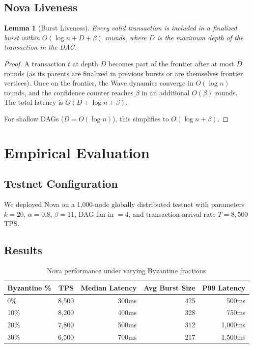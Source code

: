 \documentclass[11pt,a4paper]{article}
\newtheorem{lemma}[theorem]{Lemma}
\begin{document}
\subsection{Nova Liveness}

\begin{lemma}[Burst Liveness]
\label{lem:nova-liveness}
Every valid transaction is included in a finalized burst within $O(\log n + D + \beta)$
rounds, where $D$ is the maximum depth of the transaction in the DAG.
\end{lemma}

\begin{proof}
A transaction $t$ at depth $D$ becomes part of the frontier after at most $D$ rounds
(as its parents are finalized in previous bursts or are themselves frontier vertices).
Once on the frontier, the Wave dynamics converge in $O(\log n)$ rounds, and the
confidence counter reaches $\beta$ in an additional $O(\beta)$ rounds. The total
latency is $O(D + \log n + \beta)$.

For shallow DAGs ($D = O(\log n)$), this simplifies to $O(\log n + \beta)$.
\end{proof}

\section{Empirical Evaluation}
\label{sec:evaluation}

\subsection{Testnet Configuration}

We deployed Nova on a 1,000-node globally distributed testnet with parameters
$k = 20$, $\alpha = 0.8$, $\beta = 11$, DAG fan-in $= 4$, and transaction arrival
rate $T = 8{,}500$ TPS.

\subsection{Results}

\begin{table}[h]
\centering
\begin{tabular}{@{}lrrrr@{}}
\toprule
\textbf{Byzantine \%} & \textbf{TPS} & \textbf{Median Latency} & \textbf{Avg Burst Size} & \textbf{P99 Latency} \\
\midrule
0\% & 8,500 & 300ms & 425 & 500ms \\
10\% & 8,200 & 400ms & 328 & 750ms \\
20\% & 7,800 & 500ms & 312 & 1,000ms \\
30\% & 6,500 & 700ms & 217 & 1,500ms \\
\bottomrule
\end{tabular}
\caption{Nova performance under varying Byzantine fractions}
\label{tab:nova-results}
\end{table}
\end{document}
